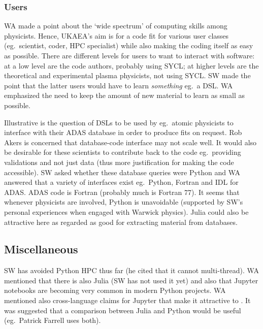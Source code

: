 \subsubsection{Users}\label{sec:users}
WA made a point about the `wide spectrum' of computing skills 
among physicists.
Hence, UKAEA's aim is for a code fit for various user 
classes (eg.\ scientist, coder, HPC specialist) while also making the coding itself as 
easy as possible. 
There are different levels for users to want to interact with software:
at a low level are the code 
authors, probably using SYCL; at higher levels are the theoretical and experimental plasma 
physicists, not using SYCL.
SW made the point that the latter users would have 
to learn {\it something} eg.\ a DSL.  WA emphasized the need to keep the amount 
of new material to learn as small as possible. 

Illustrative is the question of DSLs to be used by eg.\ atomic 
physicists to interface with their ADAS database in order to produce fits on 
request.  Rob Akers is concerned that database-code interface may not scale 
well.  It would also be desirable for these scientists to contribute back to 
the code eg.\ providing validations and not just data (thus more justification 
for making the code accessible). SW asked whether these database queries were 
Python and WA answered that a variety of interfaces exist eg.\ Python, Fortran
and IDL for ADAS.  ADAS code is Fortran (probably much is Fortran 77).
It seems that whenever 
physicists are involved, Python is unavoidable (supported by SW's personal
experiences when engaged  with  Warwick 
physics). %
Julia could also be  attractive here as regarded as  good for extracting material from databases. 


\subsection{Miscellaneous}\label{sec:misc}
SW has avoided Python HPC thus far (he cited that it cannot multi-thread).
WA mentioned that there is also Julia (SW has not used it yet) and 
also that Jupyter notebooks are becoming very common in modern Python projects.
WA mentioned also cross-language claims for Jupyter that make it attractive to \nep.
It was suggested that a comparison 
between Julia and Python would be useful (eg.\ Patrick Farrell uses both). 

